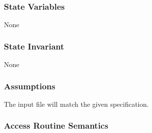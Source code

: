 \documentclass[12pt]{article}
\begin{document}
\subsubsection* {State Variables}

None

\subsubsection* {State Invariant}

None

\subsubsection* {Assumptions}

The input file will match the given specification.

\subsubsection* {Access Routine Semantics}
\end{document}
